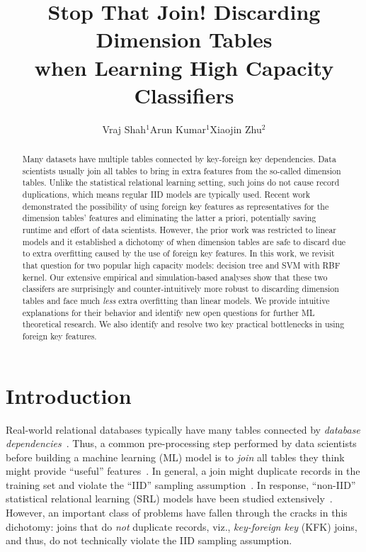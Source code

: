 \documentclass{vldb}
\title{Stop That Join! Discarding Dimension Tables \\when Learning High Capacity Classifiers}
\author{
\alignauthor Vraj Shah$^1$\hspace{20mm}Arun Kumar$^1$\hspace{20mm}Xiaojin Zhu$^2$\\
\affaddr{\vspace{2mm}$^1$University of California, San Diego\hspace{20mm}$^2$University of Wisconsin-Madison}
\email{\{vps002, arunkk\}@eng.ucsd.edu, jerryzhu@cs.wisc.edu}
}
\begin{document}
\maketitle

\begin{abstract}
Many datasets have multiple tables connected by key-foreign key dependencies.
Data scientists usually join all tables to bring in extra features from the so-called 
dimension tables. Unlike the statistical relational learning setting, such joins do 
not cause record duplications, which means regular IID models are typically used. Recent
work demonstrated the possibility of using foreign key features as representatives for the 
dimension tables' features and eliminating the latter a priori, potentially saving runtime
and effort of data scientists. However, the prior work was restricted to linear models 
and it established a dichotomy of when dimension tables are safe to discard due to extra
overfitting caused by the use of foreign key features. In this work, we revisit that question 
for two popular high capacity models: decision tree and SVM with RBF kernel. Our 
extensive empirical and simulation-based analyses show that these two classifers are surprisingly and 
counter-intuitively more robust to discarding dimension tables and face much \textit{less} extra overfitting 
than linear models. We provide intuitive explanations for their behavior and identify new open 
questions for further ML theoretical research. We also identify and resolve two key practical 
bottlenecks in using foreign key features.
\end{abstract}

\section{Introduction}

Real-world relational databases typically have many tables connected by \textit{database dependencies}~\cite{cowbook}. Thus, a common pre-processing step 
performed by data scientists before building a machine learning (ML) model is to \textit{join} all tables they think might provide 
``useful'' features~\cite{crossmine,orion,rendle,hamlet,olteanuf}.
In general, a join might duplicate records in the training set and violate the ``IID'' sampling assumption~\cite{hastie}. 
In response, ``non-IID'' statistical relational learning (SRL) models have been studied extensively~\cite{srlbook}. 
However, an important class of problems have fallen through the cracks in this dichotomy: 
joins that do \textit{not} duplicate records, viz., \textit{key-foreign key} (KFK) joins, and thus, do not technically violate the IID sampling assumption.
\end{document}
